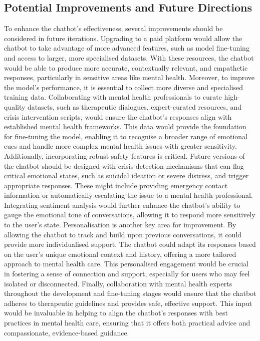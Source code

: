 \subsection{Potential Improvements and Future Directions} 
To enhance the chatbot’s effectiveness, several improvements should be considered in future iterations. Upgrading to a paid platform would allow the chatbot to take advantage of more advanced features, such as model fine-tuning and access to larger, more specialised datasets. With these resources, the chatbot would be able to produce more accurate, contextually relevant, and empathetic responses, particularly in sensitive areas like mental health.
Moreover, to improve the model’s performance, it is essential to collect more diverse and specialised training data. Collaborating with mental health professionals to curate high-quality datasets, such as therapeutic dialogues, expert-curated resources, and crisis intervention scripts, would ensure the chatbot’s responses align with established mental health frameworks. This data would provide the foundation for fine-tuning the model, enabling it to recognise a broader range of emotional cues and handle more complex mental health issues with greater sensitivity.
Additionally, incorporating robust safety features is critical. Future versions of the chatbot should be designed with crisis detection mechanisms that can flag critical emotional states, such as suicidal ideation or severe distress, and trigger appropriate responses. These might include providing emergency contact information or automatically escalating the issue to a mental health professional. Integrating sentiment analysis would further enhance the chatbot’s ability to gauge the emotional tone of conversations, allowing it to respond more sensitively to the user’s state.
Personalisation is another key area for improvement. By allowing the chatbot to track and build upon previous conversations, it could provide more individualised support. The chatbot could adapt its responses based on the user’s unique emotional context and history, offering a more tailored approach to mental health care. This personalised engagement would be crucial in fostering a sense of connection and support, especially for users who may feel isolated or disconnected.
Finally, collaboration with mental health experts throughout the development and fine-tuning stages would ensure that the chatbot adheres to therapeutic guidelines and provides safe, effective support. This input would be invaluable in helping to align the chatbot’s responses with best practices in mental health care, ensuring that it offers both practical advice and compassionate, evidence-based guidance.